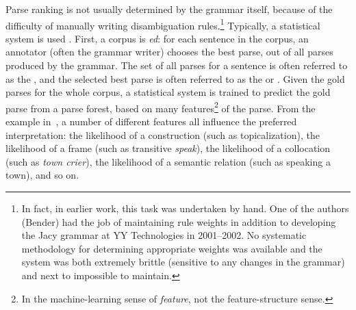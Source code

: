 \documentclass[output=paper,biblatex,babelshorthands,newtxmath,draftmode,colorlinks,citecolor=brown]{langscibook}
\begin{document}
\largerpage
Parse ranking is not usually determined by the grammar itself, because
of the difficulty of manually writing disambiguation
rules.\footnote{In fact, in earlier work, this task was undertaken by
  hand. One of the authors (Bender) had the job of maintaining rule
  weights in addition to developing the Jacy grammar \citep*{SBB2016a}
  at YY Technologies in 2001--2002. No systematic methodology for
  determining appropriate weights was available and the system was
  both extremely brittle (sensitive to any changes in the grammar) and
  next to impossible to maintain.}
Typically, a statistical system is used \citep{Tou:Man:Shi:Fli:Oep:02,Tou:Man:Fli:Oep:05}.
First, a corpus is \textit{ed}:
for each sentence in the corpus,
an annotator (often the grammar writer) chooses the best parse,
out of all parses produced by the grammar.
The set of all parses for a sentence is often referred to as the \textit{},
and the selected best parse is often referred to as the \textit{} or \textit{}.
Given the gold parses for the whole corpus, a statistical system is trained
to predict the gold parse from a parse forest,
based on many features\footnote{%
	In the machine-learning sense of \textit{feature},
	not the feature-structure sense.
}
of the parse.
From the example in~,
a number of different features all influence the preferred interpretation:
the likelihood of a construction (such as topicalization),
the likelihood of a  frame (such as transitive \textit{speak}),
the likelihood of a collocation (such as \textit{town crier}),
the likelihood of a semantic relation (such as speaking a town),
and so on.
\end{document}
